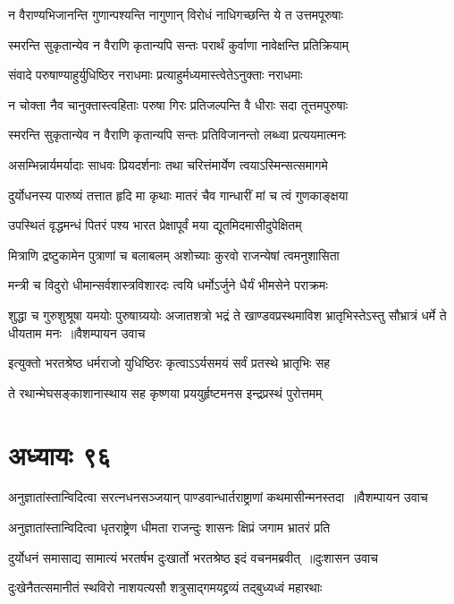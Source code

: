 \twolineshloka
{न वैराण्यभिजानन्ति गुणान्पश्यन्ति नागुणान्}
{विरोधं नाधिगच्छन्ति ये त उत्तमपूरुषाः}


\twolineshloka
{स्मरन्ति सुकृतान्येव न वैराणि कृतान्यपि}
{सन्तः परार्थं कुर्वाणा नावेक्षन्ति प्रतिक्रियाम्}


\threelineshloka
{संवादे परुषाण्याहुर्युधिष्ठिर नराधमाः}
{प्रत्याहुर्मध्यमास्त्वेतेऽनुक्ताः नराधमाः}
{}


\twolineshloka
{न चोक्ता नैव चानुक्तास्त्वहिताः परुषा गिरः}
{प्रतिजल्पन्ति वै धीराः सदा तूत्तमपुरुषाः}


\twolineshloka
{स्मरन्ति सुकृतान्येव न वैराणि कृतान्यपि}
{सन्तः प्रतिविजानन्तो लब्ध्वा प्रत्ययमात्मनः}


\twolineshloka
{असम्भिन्नार्यमर्यादाः साधवः प्रियदर्शनाः}
{तथा चरित्तंमार्येण त्वयाऽस्मिन्सत्समागमे}


\twolineshloka
{दुर्योधनस्य पारुष्यं तत्तात हृदि मा कृथाः}
{मातरं चैव गान्धारीं मां च त्वं गुणकाङ्क्षया}


\twolineshloka
{उपस्थितं वृद्धमन्धं पितरं पश्य भारत}
{प्रेक्षापूर्वं मया द्यूतमिदमासीदुपेक्षितम्}


\twolineshloka
{मित्राणि द्रष्टुकामेन पुत्राणां च बलाबलम्}
{अशोच्याः कुरवो राजन्येषां त्वमनुशासिता}


\twolineshloka
{मन्त्री च विदुरो धीमान्सर्वशास्त्रविशारदः}
{त्वयि धर्मोऽर्जुने धैर्यं भीमसेने पराक्रमः}


\threelineshloka
{शुद्धा च गुरुशुश्रूषा यमयोः पुरुषाग्र्ययोः}
{अजातशत्रो भद्रं ते खाण्डवप्रस्थमाविश}
{भ्रातृभिस्तेऽस्तु सौभ्रात्रं धर्मे ते धीयताम मनः ॥वैशम्पायन उवाच}


\twolineshloka
{इत्युक्तो भरतश्रेष्ठ धर्मराजो युधिष्ठिरः}
{कृत्वाऽऽर्यसमयं सर्वं प्रतस्थे भ्रातृभिः सह}


\twolineshloka
{ते रथान्मेघसङ्काशानास्थाय सह कृष्णया}
{प्रययुर्हृष्टमनस इन्द्रप्रस्थं पुरोत्तमम्}


\chapter{अध्यायः ९६}
\twolineshloka
{अनुज्ञातांस्तान्विदित्वा सरत्नधनसञ्जयान्}
{पाण्डवान्धार्तराष्ट्राणां कथमासीन्मनस्तदा ॥वैशम्पायन उवाच}


\twolineshloka
{अनुज्ञातांस्तान्विदित्वा धृतराष्ट्रेण धीमता}
{राजन्दुः शासनः क्षिप्रं जगाम भ्रातरं प्रति}


\twolineshloka
{दुर्योधनं समासाद्य सामात्यं भरतर्षभ}
{दुःखार्तो भरतश्रेष्ठ इदं वचनमब्रवीत् ॥दुःशासन उवाच}


\twolineshloka
{दुःखेनैतत्समानीतं स्थविरो नाशयत्यसौ}
{शत्रुसाद्गमयद्द्रव्यं तद्बुध्यध्वं महारथाः}


